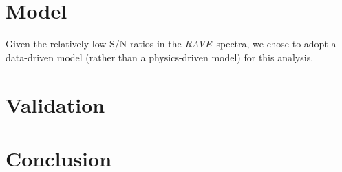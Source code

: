 \documentclass[preprint2,trackchanges]{aastex}
\newcommand{\project}[1]{\textsl{#1}}
\newcommand{\acronym}[1]{{\small{#1}}}
\newcommand{\rave}{\project{\acronym{RAVE}}}
\newcommand{\logg}{\log g}
\newcommand{\teff}{T_{\mathrm{eff}}}
\newcommand{\Nstars}{483,330}
\begin{document}
\section{Model}
\label{sec:model}

Given the relatively low S/N ratios in the \rave\ spectra, we chose to adopt a 
data-driven model (rather than a physics-driven model) for this analysis.








\section{Validation}
\label{sec:validation}






\section{Conclusion}
\label{sec:conclusion}

\end{document}
